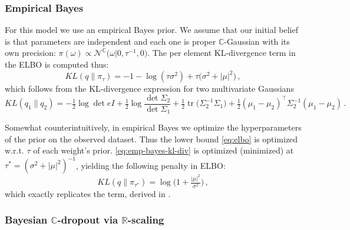 \documentclass[a4paper,10pt]{article}
\newcommand{\real}{\mathbb{R}}
\newcommand{\cplx}{\mathbb{C}}
\newcommand{\tr}[1]{\mathop{tr}{#1}}
\begin{document}

\subsubsection{Empirical Bayes} %
\label{ssub:empirical_bayes}

For this model we use an empirical Bayes prior. We assume that our initial belief is that
parameters are independent and each one is proper $\cplx$-Gaussian with its own precision: $
  \pi(\omega)
    \propto \mathcal{N}^{\cplx}\bigl(
      \omega \vert 0, \tau^{-1}, 0
    \bigr)
$. The per element KL-divergence term in the ELBO is computed thus:
\begin{equation}  \label{eq:emp-bayes-kl-div}
KL(q \| \pi_\tau)
  = - 1 - \log{(\tau \sigma^2)}
    + \tau \bigl(
      \sigma^2 + \lvert \mu \rvert^2
    \bigr)
  \,,
\end{equation}
which follows from the KL-divergence expression for two multivariate Gaussians
$$
KL(q_1\| q_2)
  =
  - \tfrac12 \log \det{e I}
  + \tfrac12 \log \frac{\det{\Sigma_2}}{\det{\Sigma_1}}
  + \tfrac12 \tr{\bigl( \Sigma_2^{-1} \Sigma_1 \bigr)}
  + \tfrac12 (\mu_1 - \mu_2)^\top \Sigma_2^{-1} (\mu_1 - \mu_2)
  \,. $$

Somewhat counterintuitively, in empirical Bayes we optimize the hyperparameters of the
prior on the observed dataset. Thus the lower bound \eqref{eq:elbo} is optimized w.r.t.
$\tau$ of each weight's prior. \eqref{eq:emp-bayes-kl-div} is optimized (minimized) at
$\tau^\ast = (\sigma^2 + \lvert \mu \rvert^2)^{-1}$, yielding the following penalty in
ELBO:
\begin{equation}  \label{eq:emp-bayes-opt-kl}
KL(q \| \pi_{\tau^\ast})
  = \log{\bigl(1 + \tfrac{\lvert \mu \rvert^2}{\sigma^2}\bigr)}
  \,,
\end{equation}
which exactly replicates the term, derived in \cite{kharitonov_variational_2018}.



\subsubsection{Bayesian $\cplx$-dropout via $\real$-scaling} %
\label{ssub:real_scaling_dropout}
\end{document}
